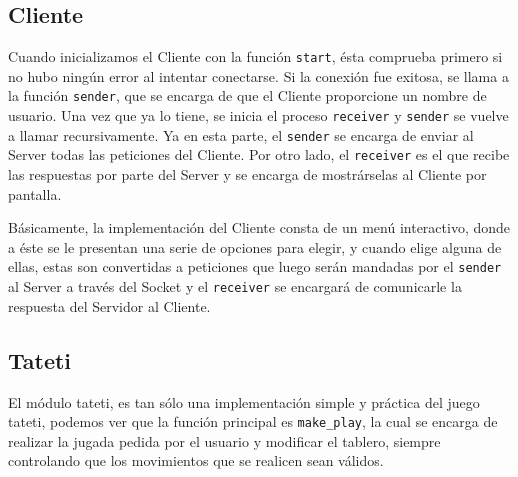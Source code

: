 \documentclass[11pt]{article}
\begin{document}
\subsection*{Cliente}

Cuando inicializamos el Cliente con la función \texttt{start}, ésta comprueba primero
si no hubo ningún error al intentar conectarse. Si la conexión fue exitosa, se llama a la
función \texttt{sender}, que se encarga de que el Cliente proporcione un nombre de usuario. Una vez
que ya lo tiene, se inicia el proceso \texttt{receiver} y \texttt{sender} se vuelve a llamar
recursivamente. Ya en esta parte, el \texttt{sender} se encarga de enviar al Server todas 
las peticiones del Cliente. Por otro lado, el \texttt{receiver} es el que recibe las respuestas
por parte del Server y se encarga de mostrárselas al Cliente por pantalla.

Básicamente, la implementación del Cliente consta de un menú interactivo, donde a éste se le presentan
una serie de opciones para elegir, y cuando elige alguna de ellas, estas son convertidas a 
peticiones que luego serán mandadas por el \texttt{sender} al Server a través del Socket y el
\texttt{receiver} se encargará de comunicarle la respuesta del Servidor al Cliente. 

\subsection*{Tateti}

El módulo tateti, es tan sólo una implementación simple y práctica del juego tateti, podemos ver
que la función principal es \texttt{make\_play}, la cual se encarga de realizar la jugada
pedida por el usuario y modificar el tablero, siempre controlando que los movimientos 
que se realicen sean válidos.
\end{document}
